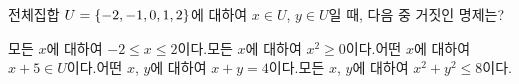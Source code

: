 전체집합 $U=\{-2{,}\mkern3mu\mathopen{}-1{,}\mkern3mu\mathopen{}0{,}\mkern3mu\mathopen{}1{,}\mkern3mu\mathopen{}2\}$에 대하여 $x\in U$, $y\in U$일 때, 다음 중 거짓인 명제는?
\begin{choicesv}{모든 $x$에 대하여 $-2\le x\le 2$이다.}{모든 $x$에 대하여 $x^2\ge 0$이다.}{어떤 $x$에 대하여 $x+5\in U$이다.}{어떤 $x$, $y$에 대하여 $x+y=4$이다.}{모든 $x$, $y$에 대하여 $x^2+y^2\le 8$이다.}\end{choicesv}
